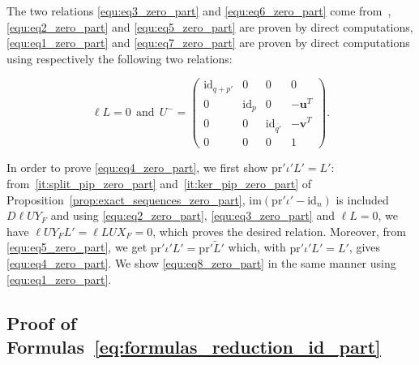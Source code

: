 \documentclass{ifacconf}
\newcommand\g[1]{\textbf{#1}}
\newcommand\id[1]{\text{id}_{#1}}
\newcommand\im{\text{im}}
\newcommand\p{\text{pr}}
\begin{document}
The two relations \eqref{equ:eq3_zero_part} and \eqref{equ:eq6_zero_part}
come from~\cite{ClQu:11}, \eqref{equ:eq2_zero_part} and
\eqref{equ:eq5_zero_part} are proven by direct computations,
\eqref{equ:eq1_zero_part} and \eqref{equ:eq7_zero_part} are proven by
direct computations using respectively the following two relations:
\begin{small}
  \[\ell L=0\ \ \text{and}\ \
  U^-=\begin{pmatrix}
  \id{q+p'} & 0 & 0 & 0\\
  0 & \id{p} & 0 & -\g{u}^T\\
  0 & 0 & \id{\overline{q'}} & -\g{v}^T\\
  0 & 0 & 0 & 1
  \end{pmatrix}.\]
\end{small}

In order to prove \eqref{equ:eq4_zero_part}, we first show $\p'\iota'L'=
L'$: from~\ref{it:split_pip_zero_part} and~\ref{it:ker_pip_zero_part} of
Proposition~\ref{prop:exact_sequences_zero_part}, $\im(\p'\iota'-\id{n})
$ is included $D\ell UY_F$ and using \eqref{equ:eq2_zero_part},
\eqref{equ:eq3_zero_part} and $\ell L=0$, we have $\ell UY_FL'=\ell LUX_F
=0$, which proves the desired relation. Moreover, from
\eqref{equ:eq5_zero_part}, we get $\p'\iota'L'=\p'\tilde{L}'$ which,
with $\p'\iota'L'=L'$, gives \eqref{equ:eq4_zero_part}. We show
\eqref{equ:eq8_zero_part} in the same manner using
\eqref{equ:eq1_zero_part}.

\subsection{Proof of Formulas~\eqref{eq:formulas_reduction_id_part}}
\label{sec:proofs_reduction_id_part}
\end{document}
